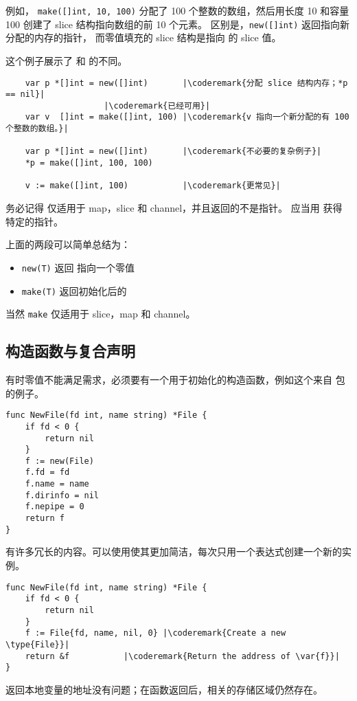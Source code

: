 例如，
\lstinline{make([]int, 10, 100)}
分配了 100 个整数的数组，然后用长度 10 和容量 100 创建了 slice 
结构指向数组的前 10 个元素。
区别是，\lstinline{new([]int)} 返回指向新分配的内存的指针，
而零值填充的 slice 结构是指向  的 slice 值。

这个例子展示了  和  的不同。
\begin{lstlisting}
    var p *[]int = new([]int)       |\coderemark{分配 slice 结构内存；*p == nil}|
				    |\coderemark{已经可用}|
    var v  []int = make([]int, 100) |\coderemark{v 指向一个新分配的有 100 个整数的数组。}|

    var p *[]int = new([]int)       |\coderemark{不必要的复杂例子}|
    *p = make([]int, 100, 100)

    v := make([]int, 100)           |\coderemark{更常见}|
\end{lstlisting}
务必记得  仅适用于 map，slice 和 channel，并且返回的不是指针。
应当用  获得特定的指针。

\begin{lbar}
上面的两段可以简单总结为：
\begin{itemize}
\item \lstinline{new(T)} 返回  指向一个零值 
\item \lstinline{make(T)} 返回初始化后的 
\end{itemize}
当然 \lstinline{make} 仅适用于 slice，map 和 channel。
\end{lbar}

\subsection{构造函数与复合声明}
\label{sec:constructors and composite literals}
有时零值不能满足需求，必须要有一个用于初始化的构造函数，例如这个来自
 包的例子。
\begin{lstlisting}
func NewFile(fd int, name string) *File {
    if fd < 0 {
        return nil
    }
    f := new(File)
    f.fd = fd
    f.name = name
    f.dirinfo = nil
    f.nepipe = 0
    return f
}
\end{lstlisting}
有许多冗长的内容。可以使用使其更加简洁，每次只用一个表达式创建一个新的实例。

\begin{lstlisting}
func NewFile(fd int, name string) *File {
    if fd < 0 {
        return nil
    }
    f := File{fd, name, nil, 0}	|\coderemark{Create a new \type{File}}|
    return &f			|\coderemark{Return the address of \var{f}}|
}
\end{lstlisting}
返回本地变量的地址没有问题；在函数返回后，相关的存储区域仍然存在。

